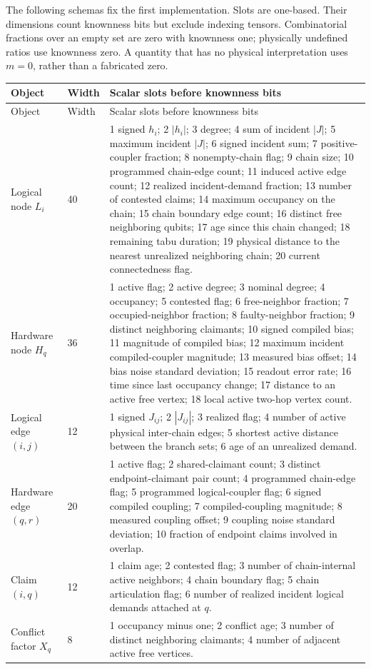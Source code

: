 \documentclass[11pt,a4paper]{article}
\theoremstyle{definition}\newtheorem{definition}[proposition]{Definition}
\begin{document}
The following schemas fix the first implementation. Slots are one-based. Their dimensions count knownness bits but exclude indexing tensors. Combinatorial fractions over an empty set are zero with knownness one; physically undefined ratios use knownness zero. A quantity that has no physical interpretation uses \(m=0\), rather than a fabricated zero.

\begin{longtable}{@{}p{}p{}p{}@{}}
\toprule
Object & Width & Scalar slots before knownness bits \\
\midrule
\endfirsthead
\toprule Object & Width & Scalar slots before knownness bits \\
\midrule
\endhead
Logical node \(L_i\) & 40 &
1 signed \(h_i\); 2 \(|h_i|\); 3 degree; 4 sum of incident \(|J|\); 5 maximum incident \(|J|\); 6 signed incident sum; 7 positive-coupler fraction; 8 nonempty-chain flag; 9 chain size; 10 programmed chain-edge count; 11 induced active edge count; 12 realized incident-demand fraction; 13 number of contested claims; 14 maximum occupancy on the chain; 15 chain boundary edge count; 16 distinct free neighboring qubits; 17 age since this chain changed; 18 remaining tabu duration; 19 physical distance to the nearest unrealized neighboring chain; 20 current connectedness flag. \\
\addlinespace
Hardware node \(H_q\) & 36 &
1 active flag; 2 active degree; 3 nominal degree; 4 occupancy; 5 contested flag; 6 free-neighbor fraction; 7 occupied-neighbor fraction; 8 faulty-neighbor fraction; 9 distinct neighboring claimants; 10 signed compiled bias; 11 magnitude of compiled bias; 12 maximum incident compiled-coupler magnitude; 13 measured bias offset; 14 bias noise standard deviation; 15 readout error rate; 16 time since last occupancy change; 17 distance to an active free vertex; 18 local active two-hop vertex count. \\
\addlinespace
Logical edge \((i,j)\) & 12 &
1 signed \(J_{ij}\); 2 \(|J_{ij}|\); 3 realized flag; 4 number of active physical inter-chain edges; 5 shortest active distance between the branch sets; 6 age of an unrealized demand. \\
\addlinespace
Hardware edge \((q,r)\) & 20 &
1 active flag; 2 shared-claimant count; 3 distinct endpoint-claimant pair count; 4 programmed chain-edge flag; 5 programmed logical-coupler flag; 6 signed compiled coupling; 7 compiled-coupling magnitude; 8 measured coupling offset; 9 coupling noise standard deviation; 10 fraction of endpoint claims involved in overlap. \\
\addlinespace
Claim \((i,q)\) & 12 &
1 claim age; 2 contested flag; 3 number of chain-internal active neighbors; 4 chain boundary flag; 5 chain articulation flag; 6 number of realized incident logical demands attached at \(q\). \\
\addlinespace
Conflict factor \(X_q\) & 8 &
1 occupancy minus one; 2 conflict age; 3 number of distinct neighboring claimants; 4 number of adjacent active free vertices. \\
\bottomrule
\end{longtable}
\end{document}
